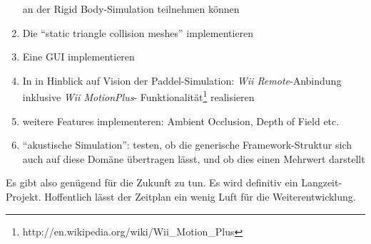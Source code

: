 \begin{enumerate}
		an der Rigid Body-Simulation teilnehmen können
		\item Die "`static triangle collision meshes"' implementieren
		\item Eine GUI implementieren
		\item In in Hinblick auf Vision der Paddel-Simulation: \emph{Wii Remote}-Anbindung inklusive \emph{Wii MotionPlus}-
		Funktionalität\footnote{http://en.wikipedia.org/wiki/Wii\_Motion\_Plus} realisieren
		\item weitere Features implementeren: Ambient Occlusion, Depth of Field etc.
		\item "`akustische Simulation"': testen, ob die generische Framework-Struktur sich auch auf diese Domäne
			übertragen lässt, und ob dies einen Mehrwert darstellt
	\end{enumerate}

	Es gibt also genügend für die Zukunft zu tun. Es wird definitiv ein Langzeit-Projekt.
	Hoffentlich lässt der Zeitplan ein wenig Luft für die Weiterentwicklung.


\clearpage
